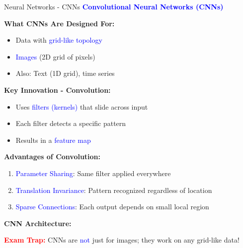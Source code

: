 \documentclass[8pt]{beamer}
\begin{document}
	\begin{frame}{Neural Networks - CNNs}
		\fontsize{6.5}{7.5}\selectfont
		\textcolor{blue}{\textbf{Convolutional Neural Networks (CNNs)}}
		
		\textbf{What CNNs Are Designed For:}
		\begin{itemize}
			\item Data with \textcolor{blue}{grid-like topology}
			\item \textcolor{blue}{Images} (2D grid of pixels)
			\item Also: Text (1D grid), time series
		\end{itemize}
		
		\textbf{Key Innovation - Convolution:}
		\begin{itemize}
			\item Uses \textcolor{blue}{filters (kernels)} that slide across input
			\item Each filter detects a specific pattern
			\item Results in a \textcolor{blue}{feature map}
		\end{itemize}
		
		\textbf{Advantages of Convolution:}
		\begin{enumerate}
			\item \textcolor{blue}{Parameter Sharing}: Same filter applied everywhere
			\item \textcolor{blue}{Translation Invariance}: Pattern recognized regardless of location
			\item \textcolor{blue}{Sparse Connections}: Each output depends on small local region
		\end{enumerate}
		
		\textbf{CNN Architecture:}
		\begin{center}
		\end{center}
		
		\textcolor{red}{\textbf{Exam Trap:}} CNNs are \textcolor{blue}{not} just for images; they work on any grid-like data!
	\end{frame}
	
\end{document}
